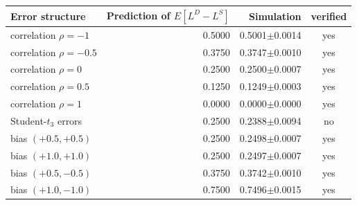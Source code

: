 \begin{tabular}{lrrc}
\toprule
Error structure & Prediction of $E[L^D-L^S]$ & Simulation & verified \\
\midrule
correlation $\rho=-1$ & 0.5000 & 0.5001$\pm$0.0014 & yes \\
correlation $\rho=-0.5$ & 0.3750 & 0.3747$\pm$0.0010 & yes \\
correlation $\rho=0$ & 0.2500 & 0.2500$\pm$0.0007 & yes \\
correlation $\rho=0.5$ & 0.1250 & 0.1249$\pm$0.0003 & yes \\
correlation $\rho=1$ & 0.0000 & 0.0000$\pm$0.0000 & yes \\
Student-$t_3$ errors & 0.2500 & 0.2388$\pm$0.0094 & no \\
bias $(+0.5,+0.5)$ & 0.2500 & 0.2498$\pm$0.0007 & yes \\
bias $(+1.0,+1.0)$ & 0.2500 & 0.2497$\pm$0.0007 & yes \\
bias $(+0.5,-0.5)$ & 0.3750 & 0.3742$\pm$0.0010 & yes \\
bias $(+1.0,-1.0)$ & 0.7500 & 0.7496$\pm$0.0015 & yes \\
\bottomrule
\end{tabular}
